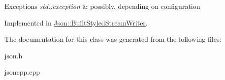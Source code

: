 \begin{DoxyExceptions}{Exceptions}
{\em std\-::exception} & possibly, depending on configuration \\
\hline
\end{DoxyExceptions}


Implemented in \hyperlink{struct_json_1_1_built_styled_stream_writer_a2ecffc3d66c4feddf208e5cd3b1c0f18}{Json\-::\-Built\-Styled\-Stream\-Writer}.



The documentation for this class was generated from the following files\-:\begin{DoxyCompactItemize}
\item 
json.\-h\item 
jsoncpp.\-cpp\end{DoxyCompactItemize}
